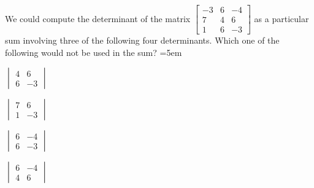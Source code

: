 




\begin{activity}
We could compute the determinant of the matrix 
\(\begin{bmatrix} -3&6&-4
\\7&4&6
\\1&6&-3 \end{bmatrix}\)  
as a particular sum involving three of the following four determinants.  
Which one of the following would not be used in the sum?
\partswidth=5em
\begin{parts}
\item \(\begin{vmatrix} 4&6\\6&-3 \end{vmatrix}\)
\item \(\begin{vmatrix} 7&6\\1&-3 \end{vmatrix}\)\actans
\item \(\begin{vmatrix} 6&-4\\6&-3 \end{vmatrix}\)
\item \(\begin{vmatrix} 6&-4\\4&6 \end{vmatrix}\)
\end{parts}
\end{activity}




